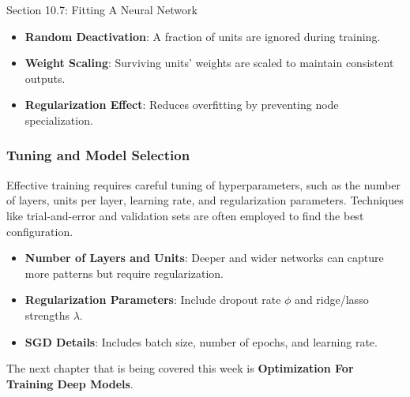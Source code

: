 \begin{notes}{Section 10.7: Fitting A Neural Network}
    \begin{highlight}
        \begin{itemize}
            \item \textbf{Random Deactivation}: A fraction of units are ignored during training.
            \item \textbf{Weight Scaling}: Surviving units' weights are scaled to maintain consistent outputs.
            \item \textbf{Regularization Effect}: Reduces overfitting by preventing node specialization.
        \end{itemize}
    \end{highlight}
    
    \subsubsection*{Tuning and Model Selection}
    
    Effective training requires careful tuning of hyperparameters, such as the number of layers, units per layer, learning rate, and regularization parameters. Techniques like trial-and-error and validation 
    sets are often employed to find the best configuration.
    
    \begin{highlight}
        \begin{itemize}
            \item \textbf{Number of Layers and Units}: Deeper and wider networks can capture more patterns but require regularization.
            \item \textbf{Regularization Parameters}: Include dropout rate $\phi$ and ridge/lasso strengths $\lambda$.
            \item \textbf{SGD Details}: Includes batch size, number of epochs, and learning rate.
        \end{itemize}
    \end{highlight}
\end{notes}

The next chapter that is being covered this week is \textbf{Optimization For Training Deep Models}.

